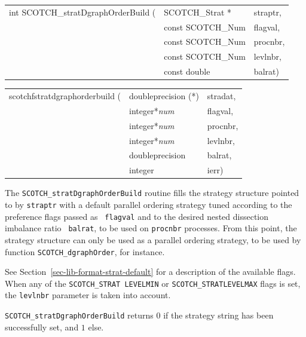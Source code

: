 \begin{itemize}
\progsyn

{\tt\begin{tabular}{l@{}ll}
int SCOTCH\_stratDgraphOrderBuild ( & SCOTCH\_Strat *   & straptr, \\
                                    & const SCOTCH\_Num & flagval, \\
                                    & const SCOTCH\_Num & procnbr, \\
                                    & const SCOTCH\_Num & levlnbr, \\
                                    & const double      & balrat)
\end{tabular}}

{\tt\begin{tabular}{l@{}ll}
scotchfstratdgraphorderbuild ( & doubleprecision (*) & stradat, \\
                               & integer*{\it num}   & flagval, \\
                               & integer*{\it num}   & procnbr, \\
                               & integer*{\it num}   & levlnbr, \\
                               & doubleprecision     & balrat,  \\
                               & integer             & ierr)
\end{tabular}}

\progdes

The {\tt SCOTCH\_stratDgraphOrderBuild} routine fills the strategy
structure pointed to by {\tt straptr} with a default parallel ordering
strategy tuned according to the preference flags passed as {\tt
flagval} and to the desired nested dissection imbalance ratio {\tt
balrat}, to be used on {\tt procnbr} processes. From this point, the
strategy structure can only be used as a parallel ordering strategy, to
be used by function {\tt SCOTCH\_\lbt dgraph\lbt Order}, for
instance.

See Section~\ref{sec-lib-format-strat-default} for a description of
the available flags. When any of the {\tt SCOTCH\_\lbt STRAT\lbt
LEVEL\lbt MIN} or {\tt SCOTCH\_\lbt STRAT\lbt LEVEL\lbt MAX} flags is
set, the {\tt levlnbr} parameter is taken into account.

\progret

{\tt SCOTCH\_stratDgraphOrderBuild} returns $0$ if the strategy string
has been successfully set, and $1$ else.
\end{itemize}

